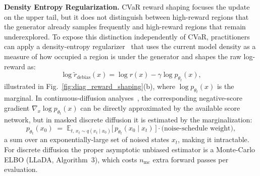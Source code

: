 \textbf{Density Entropy Regularization.}
CVaR reward shaping focuses the update on the upper tail, but it does not distinguish between high-reward regions that the generator already samples frequently and high-reward regions that remain underexplored. To expose this distinction independently of CVaR, practitioners can apply a density-entropy regularizer~\citep{de2025provable, santiFlowDensityControl, santiVerifierConstrainedFlowExpansion2026} that uses the current model density as a measure of how occupied a region is under the generator and shapes the raw log-reward as:
\begin{equation}
\log \tilde r_{\mathrm{debias}}(x)
=
\log r(x) - \gamma \log p_{\theta_t}(x),
\label{eq:debias}
\end{equation}
illustrated in Fig.~\ref{fig:diag_reward_shaping}(b), where $\log p_{\theta_t}(x)$ is the marginal. In continuous-diffusion analyses~\citep{de2025provable, santiFlowDensityControl}, the corresponding negative-score gradient $\nabla_x \log p_{\theta_t}(x)$ can be directly approximated by the available score network,  but in masked discrete diffusion it is estimated by the marginalization:
\[
p_{\theta_t}(x_0) \;=\; \mathbb{E}_{t, \, x_t \sim q(x_t \mid x_0)}\!\bigl[\,p_{\theta_t}(x_0 \mid x_t)\,\bigr] \cdot \text{(noise-schedule weight)},
\]
a sum over an exponentially-large set of noised states $x_t$, making it intractable. For discrete diffusion the proper asymptotic unbiased estimator is a Monte-Carlo ELBO \citep{nie2025llada} (LLaDA, Algorithm~3), which costs $n_{\text{mc}}$ extra forward passes per evaluation.

